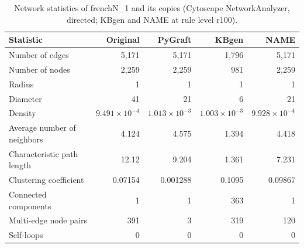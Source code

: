 \begin{table}[t]
\centering
\caption{Network statistics of frenchN\_1 and its copies (Cytoscape NetworkAnalyzer, directed; KBgen and NAME at rule level r100).}
\label{tab:cytoscape_frenchN_1}
\begin{tabular}{lrrrr}
\toprule
Statistic & Original & PyGraft & KBgen & NAME \\
\midrule
Number of edges & 5{,}171 & 5{,}171 & 1{,}796 & 5{,}171 \\
Number of nodes & 2{,}259 & 2{,}259 & 981 & 2{,}259 \\
Radius & 1 & 1 & 1 & 1 \\
Diameter & 41 & 21 & 6 & 21 \\
Density & $9.491\times10^{-4}$ & $1.013\times10^{-3}$ & $1.003\times10^{-3}$ & $9.928\times10^{-4}$ \\
Average number of neighbors & 4.124 & 4.575 & 1.394 & 4.418 \\
Characteristic path length & 12.12 & 9.204 & 1.361 & 7.231 \\
Clustering coefficient & 0.07154 & 0.001288 & 0.1095 & 0.09867 \\
Connected components & 1 & 1 & 363 & 1 \\
Multi-edge node pairs & 391 & 3 & 319 & 120 \\
Self-loops & 0 & 0 & 0 & 0 \\
\bottomrule
\end{tabular}
\end{table}
